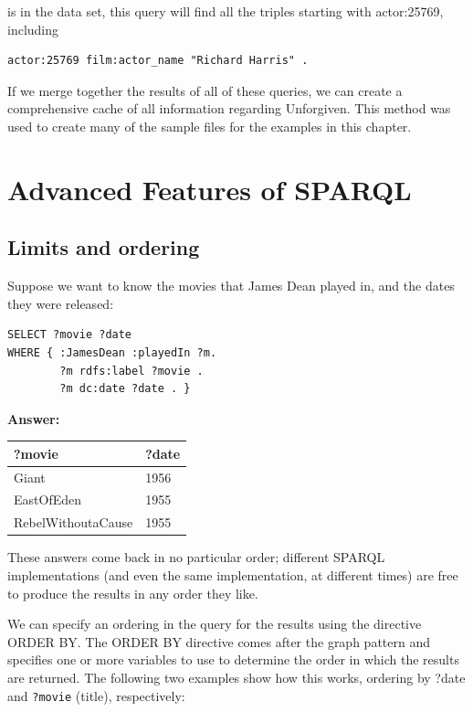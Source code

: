\begin{challenge}
is in the data set, this query will find all the triples starting with
actor:25769, including

\begin{lstlisting}
actor:25769 film:actor_name "Richard Harris" .
\end{lstlisting}

If we merge together the results of all of these queries, we can create
a comprehensive cache of all information regarding Unforgiven. This
method was used to create many of the sample files for the examples in
this chapter.
\end{challenge}

\section{Advanced Features of SPARQL}

\subsection{Limits and ordering}

Suppose we want to know the movies that James Dean played in, and the
dates they were released:


\begin{lstlisting}
SELECT ?movie ?date
WHERE { :JamesDean :playedIn ?m.
        ?m rdfs:label ?movie .
        ?m dc:date ?date . }
\end{lstlisting}


\textbf{\textbf{Answer:}}

\begin{tabular}{|ll|}
\hline
?movie&?date\\
\hline
Giant&1956\\
EastOfEden&1955\\
RebelWithoutaCause&1955\\
\hline
\end{tabular}

These answers come back in no particular order; different SPARQL
implementations (and even the same implementation, at different times)
are free to produce the results in any order they like.

We can specify an ordering in the query for the results using the
directive ORDER BY. The ORDER BY directive comes after the graph pattern
and specifies one or more variables to use to determine the order in
which the results are returned. The following two examples show how this
works, ordering by 
?date and \texttt{?movie} (title), respectively:

